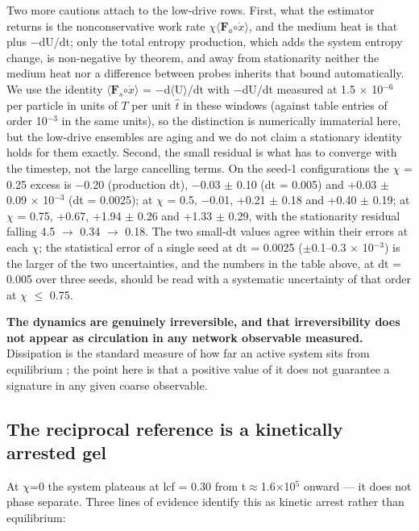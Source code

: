 \documentclass[aps,pre,preprint,superscriptaddress,nofootinbib,longbibliography]{revtex4-2}
\begin{document}
Two more cautions attach to the low-drive rows. First, what the estimator returns is the nonconservative work rate $\chi \langle$$\mathbf{F}_{a}$$\circ$\textbf{$\dot{x}$}$\rangle$, and the medium heat is that plus $-$dU/dt; only the total entropy production, which adds the system entropy change, is non-negative by theorem, and away from stationarity neither the medium heat nor a difference between probes inherits that bound automatically. We use the identity $\langle$$\mathbf{F}_{s}$$\circ$\textbf{$\dot{x}$}$\rangle$ = $-$d$\langle$U$\rangle$/dt with $-$dU/dt measured at 1.5 $\times$ 10$^{-6}$ per particle in units of $T$ per unit $\hat{t}$ in these windows (against table entries of order 10$^{-3}$ in the same units), so the distinction is numerically immaterial here, but the low-drive ensembles are aging and we do not claim a stationary identity holds for them exactly. Second, the small residual is what has to converge with the timestep, not the large cancelling terms. On the seed-1 configurations the $\chi$ = 0.25 excess is $-$0.20 (production dt), $-$0.03 $\pm$ 0.10 (dt = 0.005) and +0.03 $\pm$ 0.09 $\times$ 10$^{-3}$ (dt = 0.0025); at $\chi$ = 0.5, $-$0.01, +0.21 $\pm$ 0.18 and +0.40 $\pm$ 0.19; at $\chi$ = 0.75, +0.67, +1.94 $\pm$ 0.26 and +1.33 $\pm$ 0.29, with the stationarity residual falling 4.5 $\rightarrow$ 0.34 $\rightarrow$ 0.18. The two small-dt values agree within their errors at each $\chi$; the statistical error of a single seed at dt = 0.0025 ($\pm$0.1--0.3 $\times$ 10$^{-3}$) is the larger of the two uncertainties, and the numbers in the table above, at dt = 0.005 over three seeds, should be read with a systematic uncertainty of that order at $\chi$ $\le$ 0.75.

\textbf{The dynamics are genuinely irreversible, and that irreversibility does not appear as circulation in any network observable measured.} Dissipation is the standard measure of how far an active system sits from equilibrium \cite{r19,r20}; the point here is that a positive value of it does not guarantee a signature in any given coarse observable.

\subsection{The reciprocal reference is a kinetically arrested gel}

At $\chi$=0 the system plateaus at lcf = 0.30 from t$\approx$1.6$\times$10$^{5}$ onward --- it does not phase separate. Three lines of evidence identify this as kinetic arrest rather than equilibrium:
\end{document}
